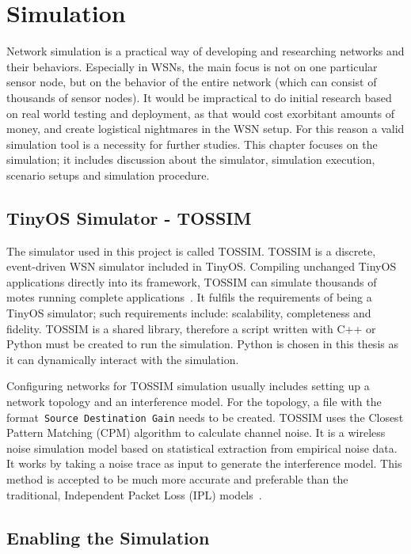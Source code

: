 \chapter{Simulation}
\label{Sim}
Network simulation is a practical way of developing and researching networks and their
behaviors. Especially in WSNs, the main focus is not on one particular sensor node, but on
the behavior of the entire network (which can consist of thousands of sensor nodes). It would
be impractical to do initial research based on real world testing and deployment, as that would cost exorbitant amounts of money, and create logistical nightmares in the WSN setup. For this reason a valid
simulation tool is a necessity for further studies. This chapter focuses on the simulation; it 
includes discussion about the simulator, simulation execution, scenario setups and simulation procedure.

\section{TinyOS Simulator - TOSSIM}
\label{Sim:TOSSIM}

The simulator used in this project is called TOSSIM\@. TOSSIM is a discrete, event-driven WSN simulator included in TinyOS. Compiling unchanged TinyOS applications
directly into its framework, TOSSIM can simulate thousands of motes running complete
applications~\cite{LLWC}. It fulfils the requirements of being a TinyOS simulator; such requirements include: scalability, completeness and fidelity. TOSSIM is a shared library, therefore a script written with C++ or Python must be created to run the simulation.  Python is chosen in this thesis as it can dynamically interact with the simulation.

Configuring networks for TOSSIM simulation usually includes setting
up a network topology and an interference model. For the topology, a file with the format~\texttt{Source Destination Gain} needs to be created. TOSSIM uses the Closest Pattern Matching (CPM) algorithm to calculate channel noise. It is a wireless noise simulation model
based on statistical extraction from empirical noise data. It works by taking a noise trace as input to generate the interference model. This method is accepted to be much more accurate and preferable than the traditional, Independent Packet Loss (IPL) models~\cite{TOSSIM}.

\section{Enabling the Simulation}
\label{Sim:Enabling}

